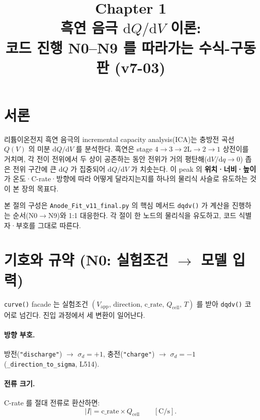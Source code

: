 \documentclass[11pt,a4paper]{article}
\title{\textbf{\LARGE Chapter 1}\\[0.4em]
  \Large 흑연 음극 $\mathrm{d}Q/\mathrm{d}V$ 이론:\\
  코드 진행 N0--N9 를 따라가는 수식-구동판 (v7-03)}
\author{}
\date{}
\newcommand{\dd}{\mathrm{d}}
\newcommand{\app}{\mathrm{app}}
\newcommand{\cell}{\mathrm{cell}}
\begin{document}
\maketitle

\section*{서론}

리튬이온전지 흑연 음극의 incremental capacity analysis(ICA)는 충방전 곡선 $Q(V)$ 의
미분 $\dd Q/\dd V$ 를 분석한다. 흑연은 stage $4\!\to\!3\!\to\!2\mathrm{L}\!\to\!2\!\to\!1$ 상전이를
거치며, 각 전이 전위에서 두 상이 공존하는 동안 전위가 거의 평탄해($\dd V/\dd q\to0$)
좁은 전위 구간에 큰 $\dd Q$ 가 집중되어 $\dd Q/\dd V$ 가 치솟는다. 이 peak 의
\textbf{위치·너비·높이}가 온도·C-rate·방향에 따라 어떻게 달라지는지를 하나의
물리식 사슬로 유도하는 것이 본 장의 목표다.

본 절의 구성은 \texttt{Anode\_Fit\_v11\_final.py} 의 핵심 메서드 \texttt{dqdv()}
가 계산을 진행하는 순서(N0$\to$N9)와 1:1 대응한다. 각 절이 한 노드의
물리식을 유도하고, 코드 식별자·부호를 그대로 따른다.

\tableofcontents
\newpage

\section{기호와 규약 (N0: 실험조건 $\to$ 모델 입력)}\label{sec:notation}

\texttt{curve()} facade 는 실험조건 $(V_\app,\,\text{direction},\,\text{c\_rate},\,
Q_\cell,\,T)$ 를 받아 \texttt{dqdv()} 코어로 넘긴다. 진입 과정에서 세 변환이 일어난다.

\paragraph{방향 부호.}
방전(\texttt{"discharge"}) $\to$ $\sigma_d=+1$, 충전(\texttt{"charge"}) $\to$
$\sigma_d=-1$ (\texttt{\_direction\_to\_sigma}, L514).

\paragraph{전류 크기.}
C-rate 를 절대 전류로 환산하면:
\begin{equation}
|I| = \text{c\_rate}\times Q_\cell \qquad [\mathrm{C/s}].
\label{eq:iabs}
\end{equation}
\end{document}
